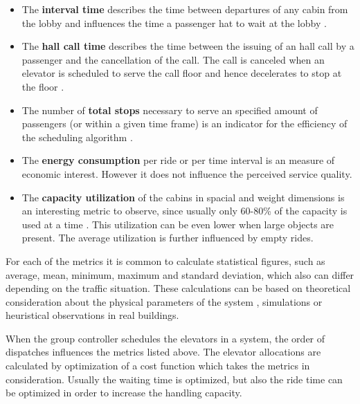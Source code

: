 \begin{itemize}
    \item The \textbf{interval time} 
        describes the time between departures of any cabin from the lobby 
        and influences the time a passenger hat to wait at the lobby
        \autocite[][pp.8-9]{siikonen1997models}.
    
    \item The \textbf{hall call time} 
        describes the time between the issuing of an hall call by a passenger and the cancellation of the call. 
        The call is canceled when an elevator is scheduled to serve the call floor and hence decelerates to stop at the floor
        \autocite[][pp.8-9]{siikonen1997models}. 
    
    \item The number of \textbf{total stops}
        necessary to serve an specified amount of passengers (or within a given time frame) is an indicator for the efficiency of the scheduling algorithm
        \autocite[][p.~194]{unger2015aufzuege}.
    
    \item The \textbf{energy consumption} 
        per ride or per time interval is an measure of economic interest. 
        However it does not influence the perceived service quality.
    
    \item The \textbf{capacity utilization} 
        of the cabins in spacial and weight dimensions is an interesting metric to observe, 
        since usually only 60-80\% of the capacity is used at a time 
        \autocite[][p.~194]{unger2015aufzuege}
        \autocite[][p.~7]{hakonen2003simulation}.
        This utilization can be even lower when large objects are present.
        The average utilization is further influenced by empty rides.
        
\end{itemize}

For each of the metrics it is common to calculate statistical figures, such as average, mean, minimum, maximum and standard deviation, which also can differ depending on the traffic situation.
These calculations can be based on theoretical consideration about the physical parameters of the system \autocite[][p.~194]{unger2015aufzuege}, simulations or heuristical observations in real buildings.
 
When the group controller schedules the elevators in a system, the order of dispatches influences the metrics listed above.
The elevator allocations are calculated by optimization of a cost function which takes the metrics in consideration.
Usually the waiting time is optimized, but also the ride time can be optimized in order to increase the handling capacity. \autocite[][p.~10]{siikonen1997models} 

